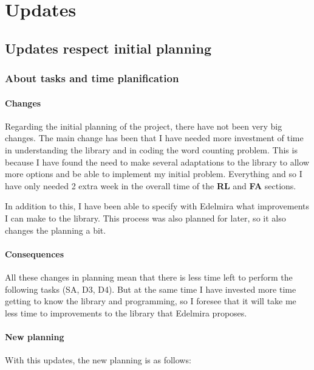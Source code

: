 \chapter{Updates}
\section{Updates respect initial planning}
\subsection{About tasks and time planification}
\subsubsection*{Changes}
Regarding the initial planning of the project, there have not been very big changes.
The main change has been that I have needed more investment of time in understanding the library and in coding the word counting problem.
This is because I have found the need to make several adaptations to the library to allow more options and be able to implement my initial problem.
Everything and so I have only needed 2 extra week in the overall time of the \textbf{RL} and \textbf{FA} sections.

In addition to this, I have been able to specify with Edelmira what improvements I can make to the library.
This process was also planned for later, so it also changes the planning a bit.

\subsubsection*{Consequences}
All these changes in planning mean that there is less time left to perform the following tasks (SA, D3, D4).
But at the same time I have invested more time getting to know the library and programming, so I foresee that it will take me less time to improvements to the library that Edelmira proposes. 

\subsubsection*{New planning}
With this updates, the new planning is as follows:
\newpage

